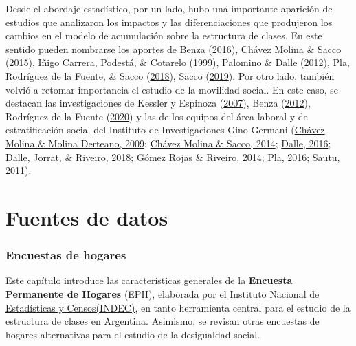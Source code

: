\documentclass[
]{article}
\begin{document}
Desde el abordaje estadístico, por un lado, hubo una importante aparición de estudios que analizaron los impactos y las diferenciaciones que produjeron los cambios en el modelo de acumulación sobre la estructura de clases. En este sentido pueden nombrarse los aportes de Benza (\protect\hyperlink{ref-Benza2016}{2016}), Chávez Molina \& Sacco (\protect\hyperlink{ref-ChavezMolina2015}{2015}), Iñigo Carrera, Podestá, \& Cotarelo (\protect\hyperlink{ref-InigoCarrera1999}{1999}), Palomino \& Dalle (\protect\hyperlink{ref-Palomino.Dalle2012}{2012}), Pla, Rodríguez de la Fuente, \& Sacco (\protect\hyperlink{ref-Pla.etal2018}{2018}), Sacco (\protect\hyperlink{ref-Sacco2019}{2019}). Por otro lado, también volvió a retomar importancia el estudio de la movilidad social. En este caso, se destacan las investigaciones de Kessler y Espinoza (\protect\hyperlink{ref-Kessler2007}{2007}), Benza (\protect\hyperlink{ref-Benza2012}{2012}), Rodríguez de la Fuente (\protect\hyperlink{ref-RodriguezdelaFuente2020}{2020}) y las de los equipos del área laboral y de estratificación social del Instituto de Investigaciones Gino Germani (\protect\hyperlink{ref-ChavezMolina2009}{Chávez Molina \& Molina Derteano, 2009}; \protect\hyperlink{ref-ChavezMolina2014}{Chávez Molina \& Sacco, 2014}; \protect\hyperlink{ref-Dalle2016}{Dalle, 2016}; \protect\hyperlink{ref-Dalle.etal2018}{Dalle, Jorrat, \& Riveiro, 2018}; \protect\hyperlink{ref-GomezRojas.Riveiro2014}{Gómez Rojas \& Riveiro, 2014}; \protect\hyperlink{ref-Pla2016}{Pla, 2016}; \protect\hyperlink{ref-Sautu2011}{Sautu, 2011}).

\hypertarget{part-fuentes-de-datos}{%
\part{Fuentes de datos}\label{part-fuentes-de-datos}}

\hypertarget{fuentes}{%
\section{Encuestas de hogares}\label{fuentes}}

Este capítulo introduce las características generales de la \textbf{Encuesta Permanente de Hogares} (EPH), elaborada por el \href{www.indec.gob.ar}{Instituto Nacional de Estadísticas y Censos(INDEC)}, en tanto herramienta central para el estudio de la estructura de clases en Argentina. Asimismo, se revisan otras encuestas de hogares alternativas para el estudio de la desigualdad social.
\end{document}
